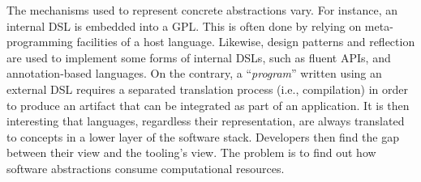 The mechanisms used to represent concrete abstractions vary.
For instance, an internal DSL is embedded into a \gls{GPL}.
This is often done by relying on meta-programming facilities of a host language.
Likewise, design patterns and reflection are used to implement some forms of internal DSLs, such as fluent APIs, and annotation-based languages.
On the contrary, a ``\textit{program}'' written using an external DSL requires a separated translation process (i.e., compilation) in order to produce an artifact that can be integrated as part of an application.
It is then interesting that languages, regardless their representation, are always translated to concepts in a lower layer of the software stack.
Developers then find the gap between their view and the tooling's view. 
The problem is to find out how software abstractions consume computational resources.



